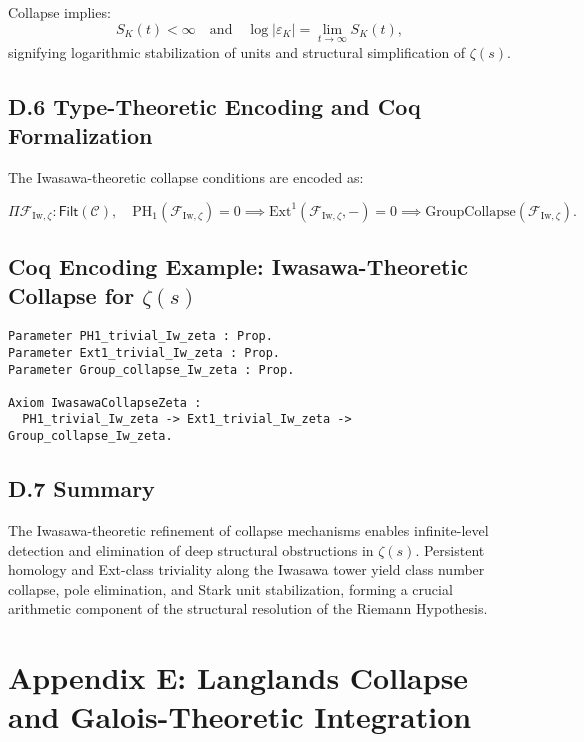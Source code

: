 \documentclass[11pt]{article}
\begin{document}
Collapse implies:
\[
S_K(t) < \infty \quad \text{and} \quad \log |\varepsilon_K| = \lim_{t \to \infty} S_K(t),
\]
signifying logarithmic stabilization of units and structural simplification of $\zeta(s)$.

\subsection*{D.6 Type-Theoretic Encoding and Coq Formalization}

The Iwasawa-theoretic collapse conditions are encoded as:

\[
\Pi \mathcal{F}_{\mathrm{Iw}, \zeta} : \mathsf{Filt}(\mathcal{C}), \quad 
\mathrm{PH}_1(\mathcal{F}_{\mathrm{Iw}, \zeta}) = 0 \implies 
\mathrm{Ext}^1(\mathcal{F}_{\mathrm{Iw}, \zeta}, -) = 0 \implies 
\mathrm{GroupCollapse}(\mathcal{F}_{\mathrm{Iw}, \zeta}).
\]

\subsection*{Coq Encoding Example: Iwasawa-Theoretic Collapse for $\zeta(s)$}

\begin{lstlisting}[language=Coq, caption=Coq Formalization of Iwasawa-Theoretic Collapse for $\zeta(s)$, captionpos=b]
Parameter PH1_trivial_Iw_zeta : Prop.
Parameter Ext1_trivial_Iw_zeta : Prop.
Parameter Group_collapse_Iw_zeta : Prop.

Axiom IwasawaCollapseZeta :
  PH1_trivial_Iw_zeta -> Ext1_trivial_Iw_zeta -> Group_collapse_Iw_zeta.
\end{lstlisting}

\subsection*{D.7 Summary}

The Iwasawa-theoretic refinement of collapse mechanisms enables infinite-level detection and elimination of deep structural obstructions in $\zeta(s)$. Persistent homology and Ext-class triviality along the Iwasawa tower yield class number collapse, pole elimination, and Stark unit stabilization, forming a crucial arithmetic component of the structural resolution of the Riemann Hypothesis.



\section*{Appendix E: Langlands Collapse and Galois-Theoretic Integration}
\end{document}
